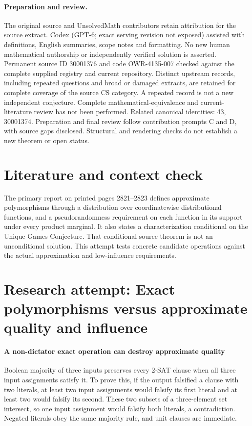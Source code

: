 \documentclass[11pt]{article}
\begin{document}
\paragraph{Preparation and review.}
The original source and UnsolvedMath contributors retain attribution for the source extract. Codex (GPT-6; exact serving revision not exposed) assisted with definitions, English summaries, scope notes and formatting. No new human mathematical authorship or independently verified solution is asserted. Permanent source ID 30001376 and code OWR-4135-007 checked against the complete supplied registry and current repository. Distinct upstream records, including repeated questions and broad or damaged extracts, are retained for complete coverage of the source CS category. A repeated record is not a new independent conjecture. Complete mathematical-equivalence and current-literature review has not been performed. Related canonical identities: 43, 30001374. Preparation and final review follow contribution prompts C and D, with source gaps disclosed. Structural and rendering checks do not establish a new theorem or open status.
\label{end:30001376}

\section{Literature and context check}
The primary report on printed pages 2821--2823 defines approximate polymorphisms through a distribution over coordinatewise distributional functions, and a pseudorandomness requirement on each function in its support under every product marginal. It also states a characterization conditional on the Unique Games Conjecture. That conditional source theorem is not an unconditional solution. This attempt tests concrete candidate operations against the actual approximation and low-influence requirements.
\section{Research attempt: Exact polymorphisms versus approximate quality and influence}

\paragraph{A non-dictator exact operation can destroy approximate quality}
Boolean majority of three inputs preserves every 2-SAT clause when all three input assignments satisfy it. To prove this, if the output falsified a clause with two literals, at least two input assignments would falsify its first literal and at least two would falsify its second. These two subsets of a three-element set intersect, so one input assignment would falsify both literals, a contradiction. Negated literals obey the same majority rule, and unit clauses are immediate.
\end{document}
